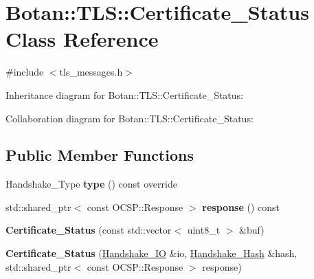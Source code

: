 \hypertarget{class_botan_1_1_t_l_s_1_1_certificate___status}{}\section{Botan\+:\+:T\+LS\+:\+:Certificate\+\_\+\+Status Class Reference}
\label{class_botan_1_1_t_l_s_1_1_certificate___status}


{\ttfamily \#include $<$tls\+\_\+messages.\+h$>$}



Inheritance diagram for Botan\+:\+:T\+LS\+:\+:Certificate\+\_\+\+Status\+:


Collaboration diagram for Botan\+:\+:T\+LS\+:\+:Certificate\+\_\+\+Status\+:
\subsection*{Public Member Functions}
\begin{DoxyCompactItemize}
\item 
\mbox{\label{class_botan_1_1_t_l_s_1_1_certificate___status_a5fdb35a16d359c20ae87cb6fcba0c225}} 
Handshake\+\_\+\+Type {\bfseries type} () const override
\item 
\mbox{\label{class_botan_1_1_t_l_s_1_1_certificate___status_a190d2560f539382497c132c7c982c543}} 
std\+::shared\+\_\+ptr$<$ const O\+C\+S\+P\+::\+Response $>$ {\bfseries response} () const
\item 
\mbox{\label{class_botan_1_1_t_l_s_1_1_certificate___status_aba3aff6b2e745b9fc70c9a2fd0527425}} 
{\bfseries Certificate\+\_\+\+Status} (const std\+::vector$<$ uint8\+\_\+t $>$ \&buf)
\item 
\mbox{\label{class_botan_1_1_t_l_s_1_1_certificate___status_ae09cda79b422f560c5e54bf907316fb2}} 
{\bfseries Certificate\+\_\+\+Status} (\mbox{\hyperlink{class_botan_1_1_t_l_s_1_1_handshake___i_o}{Handshake\+\_\+\+IO}} \&io, \mbox{\hyperlink{class_botan_1_1_t_l_s_1_1_handshake___hash}{Handshake\+\_\+\+Hash}} \&hash, std\+::shared\+\_\+ptr$<$ const O\+C\+S\+P\+::\+Response $>$ response)
\end{DoxyCompactItemize}


